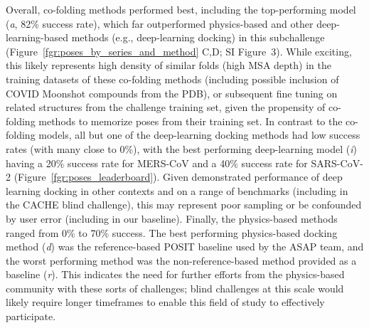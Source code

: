 \documentclass[journal=jcim,manuscript=article]{achemso}
\begin{document}
{Overall, co-folding methods performed best, including the top-performing model (\textit{a}, 82\% success rate), which far outperformed physics-based and other deep-learning-based methods (e.g., deep-learning docking) in this subchallenge (Figure~\ref{fgr:poses_by_series_and_method} C,D; SI Figure~3). While exciting, this likely represents high density of similar folds (high MSA depth) in the training datasets of these co-folding methods (including possible inclusion of COVID Moonshot compounds from the PDB), or subsequent fine tuning on related structures from the challenge training set, given the propensity of co-folding methods to memorize poses from their training set\cite{skrinjar_cofold_mem_2025}. In contrast to the co-folding models, all but one of the deep-learning docking methods had low success rates (with many close to 0\%), with the best performing deep-learning model (\textit{i}) having a 20\% success rate for MERS-CoV and a 40\% success rate for SARS-CoV-2 (Figure~\ref{fgr:poses_leaderboard}). Given demonstrated performance of deep learning docking in other contexts and on a range of benchmarks (including in the CACHE blind challenge\cite{dunn_cache_2024}), this may represent poor sampling or be confounded by user error (including in our baseline).  Finally, the physics-based methods ranged from 0\% to 70\% success. The best performing physics-based docking method (\textit{d}) was the reference-based POSIT baseline used by the ASAP team, and the worst performing method was the non-reference-based method provided as a baseline (\textit{r}). This indicates the need for further efforts from the physics-based community with these sorts of challenges; blind challenges at this scale would likely require longer timeframes to enable this field of study to effectively participate.


}
\end{document}
